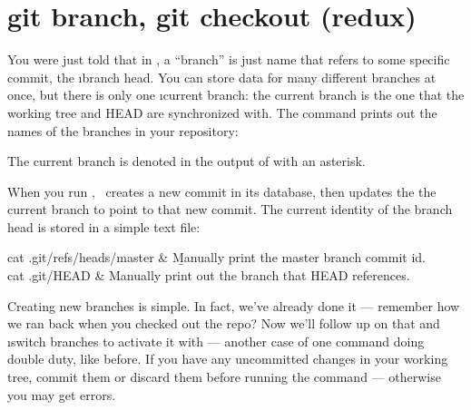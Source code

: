 \documentclass[letterpaper, 12pt, titlepage, twoside]{article}
\begin{document}
\section{git branch, git checkout (redux)}


You \x were just told that in \git, a ``branch'' is just name that refers to
some specific commit, the \i{branch head}. You can store data for many
different branches at once, but there is only one \i{current branch}: the
current branch is the one that the working tree and HEAD are synchronized
with. The  command prints out the names of the branches in your
repository:


The current branch is denoted in the output of  with an asterisk.



When \x you run , \git\ creates a new commit in its database, then
updates the the current branch to point to that new commit. The current
identity of the branch head is stored in a simple text file:

\begin{typeme}
cat .git/refs/heads/master & \b{Manually print the master branch commit id.} \\
cat .git/HEAD & Manually print out the branch that HEAD references.
\end{typeme}

Creating new branches is simple. In fact, we've already done it --- remember how
we ran  back when you checked out the repo? Now we'll
follow up on that and \i{switch branches} to activate it with  ---
another case of one command doing double duty, like  before. If you
have any uncommitted changes in your working tree, commit them or discard them
before running the  command --- otherwise you may get errors.
\end{document}
